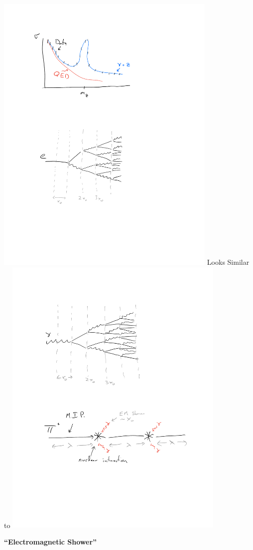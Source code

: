 {\begin{minipage}{0.5\textwidth}
\includegraphics[width=0.8\textwidth]{./ElectronShower.pdf}
\bc
Looks Similar to 
\ec
\includegraphics[width=0.8\textwidth]{./PhotonShower.pdf}
\end{minipage}\hfill
\begin{minipage}{0.5\textwidth}
\bc
\textbf{``Electromagnetic Shower''}
\ec


\end{minipage}}
